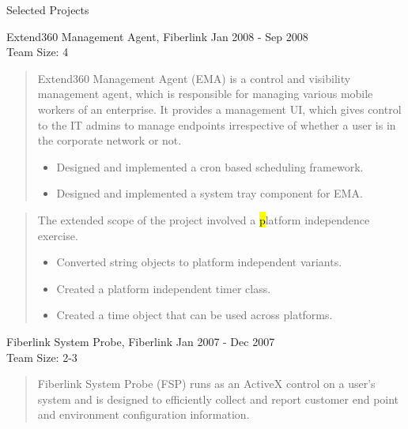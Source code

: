 \documentclass{resume}
\newcommand{\teamsize}{\\\sc\footnotesize Team Size: }
\begin{document}
\begin{category}{Selected Projects}{}

    \item {\topic Extend360 Management Agent,} Fiberlink
        {\period Jan 2008 - Sep 2008}
        {\teamsize 4}
        \begin{quote}
            Extend360 Management Agent (EMA) is a control and visibility
            management agent, which is responsible for managing various mobile
            workers of an enterprise. It provides a management UI, which gives
            control to the IT admins to manage endpoints irrespective of
            whether a user is in the corporate network or not.

            \begin{itemize}
                \item Designed and implemented a cron based scheduling framework.
                \item Designed and implemented a system tray component for EMA.
            \end{itemize}
        \end{quote}
        \begin{quote}
            The extended scope of the project involved a {\hl platform independence}
            exercise.

            \begin{itemize}
                \item Converted string objects to platform independent
                    variants.
                \item Created a platform independent timer class.
                \item Created a time object that can be used across platforms.
            \end{itemize}
        \end{quote}

    \item {\topic Fiberlink System Probe,} Fiberlink
        {\period Jan 2007 - Dec 2007}
        {\teamsize 2-3}
        \begin{quote}
            Fiberlink System Probe (FSP) runs as an ActiveX control on a user's system
            and is designed to efficiently collect and report customer end
            point and environment configuration information.


\end{quote}
\end{category}
\end{document}
